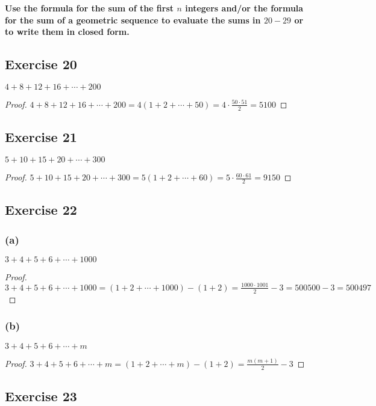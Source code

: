 \documentclass[14pt]{extarticle}
\newcommand{\dps}{\displaystyle}
\newcommand{\cy}{\color{cyan}}
\begin{document}
{\bf \cy Use the formula for the sum of the first $n$ integers and/or the formula for the sum of a geometric sequence to evaluate the sums in $20-29$ or to write them in closed form.}

\subsection{Exercise 20}
$4 + 8 + 12 + 16 + \cdots + 200$

\begin{proof}
    $\dps 4 + 8 + 12 + 16 + \cdots + 200 = 4(1+2+\cdots+50) = 4 \cdot \frac{50 \cdot 51}{2} = 5100$
\end{proof}

\subsection{Exercise 21}
$5 + 10 + 15 + 20 + \cdots + 300$

\begin{proof}
    $\dps 5 + 10 + 15 + 20 + \cdots + 300 = 5(1+2+\cdots+60) = 5 \cdot \frac{60 \cdot 61}{2} = 9150$
\end{proof}

\subsection{Exercise 22}
\subsubsection{(a)}
$3 + 4 + 5 + 6 + \cdots + 1000$

\begin{proof}
    $\dps 3 + 4 + 5 + 6 + \cdots + 1000 = (1+2+\cdots+1000) - (1+2) = \frac{1000 \cdot 1001}{2} - 3 = 500500-3 = 500497$
\end{proof}

\subsubsection{(b)}
$3 + 4 + 5 + 6 + \cdots + m$

\begin{proof}
    $\dps 3 + 4 + 5 + 6 + \cdots + m = (1+2+\cdots+m) - (1+2) = \frac{m(m+1)}{2} - 3$
\end{proof}

\subsection{Exercise 23}
\end{document}
